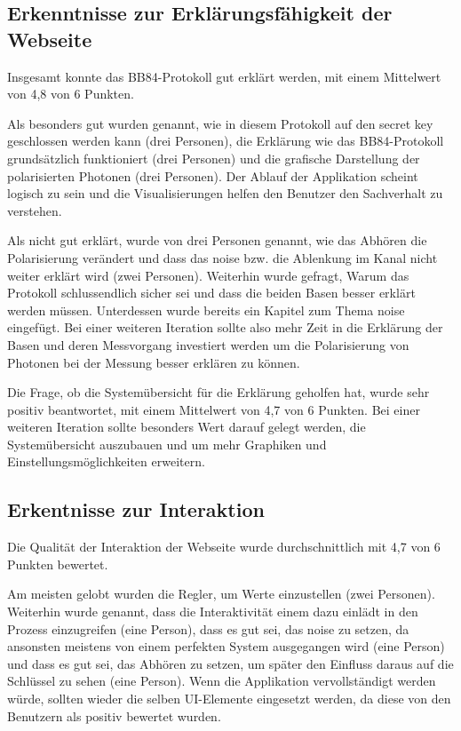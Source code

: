 \documentclass[a4paper,10.2pt,pdftex]{scrartcl}%
\begin{document}
\subsection{Erkenntnisse zur Erklärungsfähigkeit der Webseite}
Insgesamt konnte das BB84-Protokoll gut erklärt werden, mit einem Mittelwert von 4,8 von 6 Punkten.

Als besonders gut wurden genannt, wie in diesem Protokoll auf den secret key geschlossen werden kann (drei Personen), die Erklärung wie das BB84-Protokoll grundsätzlich funktioniert (drei Personen) und die grafische Darstellung der polarisierten Photonen (drei Personen). Der Ablauf der Applikation scheint logisch zu sein und die Visualisierungen helfen den Benutzer den Sachverhalt zu verstehen.

Als nicht gut erklärt, wurde von drei Personen genannt, wie das Abhören die Polarisierung verändert und dass das noise bzw. die Ablenkung im Kanal nicht weiter erklärt wird (zwei Personen). Weiterhin wurde gefragt, Warum das Protokoll schlussendlich sicher sei und dass die beiden Basen besser erklärt werden müssen. Unterdessen wurde bereits ein Kapitel zum Thema noise eingefügt. Bei einer weiteren Iteration sollte also mehr Zeit in die Erklärung der Basen und deren Messvorgang investiert werden um die Polarisierung von Photonen bei der Messung besser erklären zu können.

Die Frage, ob die Systemübersicht für die Erklärung geholfen hat, wurde sehr positiv beantwortet, mit einem Mittelwert von 4,7 von 6 Punkten. Bei einer weiteren Iteration sollte besonders Wert darauf gelegt werden, die Systemübersicht auszubauen und um mehr Graphiken und Einstellungsmöglichkeiten erweitern. 
\subsection{Erkentnisse zur Interaktion}
Die Qualität der Interaktion der Webseite wurde durchschnittlich mit 4,7 von 6 Punkten bewertet.

Am meisten gelobt wurden die Regler, um Werte einzustellen (zwei Personen). Weiterhin wurde genannt, dass die Interaktivität einem dazu einlädt in den Prozess einzugreifen (eine Person), dass es gut sei, das noise zu setzen, da ansonsten meistens von einem perfekten System ausgegangen wird (eine Person) und dass es gut sei, das Abhören zu setzen, um später den Einfluss daraus auf die Schlüssel zu sehen (eine Person). Wenn die Applikation vervollständigt werden würde, sollten wieder die selben UI-Elemente eingesetzt werden, da diese von den Benutzern als positiv bewertet wurden.
\end{document}
